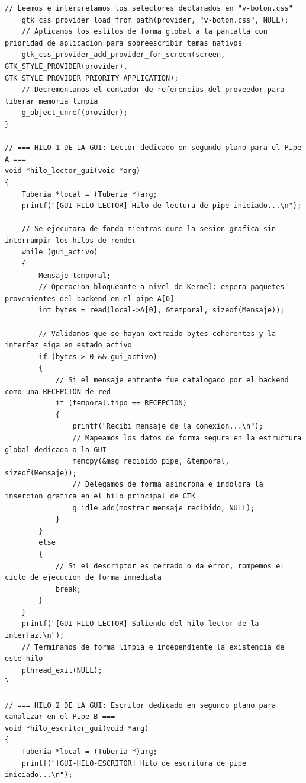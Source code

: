 \begin{lstlisting}[style=estiloC, caption={Archivo del Front-End (conexion P2P)}]
    // Leemos e interpretamos los selectores declarados en "v-boton.css"
    gtk_css_provider_load_from_path(provider, "v-boton.css", NULL);
    // Aplicamos los estilos de forma global a la pantalla con prioridad de aplicacion para sobreescribir temas nativos
    gtk_css_provider_add_provider_for_screen(screen, GTK_STYLE_PROVIDER(provider), GTK_STYLE_PROVIDER_PRIORITY_APPLICATION);
    // Decrementamos el contador de referencias del proveedor para liberar memoria limpia
    g_object_unref(provider);
}

// === HILO 1 DE LA GUI: Lector dedicado en segundo plano para el Pipe A ===
void *hilo_lector_gui(void *arg)
{
    Tuberia *local = (Tuberia *)arg;
    printf("[GUI-HILO-LECTOR] Hilo de lectura de pipe iniciado...\n");

    // Se ejecutara de fondo mientras dure la sesion grafica sin interrumpir los hilos de render
    while (gui_activo)
    {
        Mensaje temporal;
        // Operacion bloqueante a nivel de Kernel: espera paquetes provenientes del backend en el pipe A[0]
        int bytes = read(local->A[0], &temporal, sizeof(Mensaje));

        // Validamos que se hayan extraido bytes coherentes y la interfaz siga en estado activo
        if (bytes > 0 && gui_activo)
        {
            // Si el mensaje entrante fue catalogado por el backend como una RECEPCION de red
            if (temporal.tipo == RECEPCION)
            {
                printf("Recibi mensaje de la conexion...\n");
                // Mapeamos los datos de forma segura en la estructura global dedicada a la GUI
                memcpy(&msg_recibido_pipe, &temporal, sizeof(Mensaje));
                // Delegamos de forma asincrona e indolora la insercion grafica en el hilo principal de GTK
                g_idle_add(mostrar_mensaje_recibido, NULL);
            }
        }
        else
        {
            // Si el descriptor es cerrado o da error, rompemos el ciclo de ejecucion de forma inmediata
            break;
        }
    }
    printf("[GUI-HILO-LECTOR] Saliendo del hilo lector de la interfaz.\n");
    // Terminamos de forma limpia e independiente la existencia de este hilo
    pthread_exit(NULL);
}

// === HILO 2 DE LA GUI: Escritor dedicado en segundo plano para canalizar en el Pipe B ===
void *hilo_escritor_gui(void *arg)
{
    Tuberia *local = (Tuberia *)arg;
    printf("[GUI-HILO-ESCRITOR] Hilo de escritura de pipe iniciado...\n");


\end{lstlisting}
